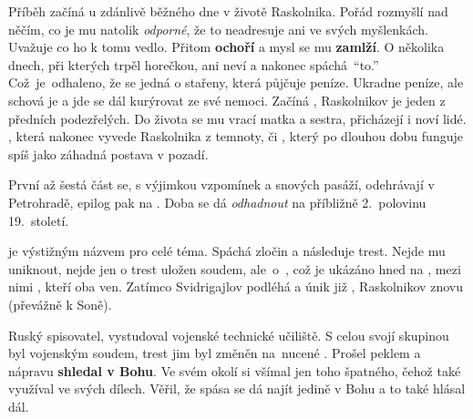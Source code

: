 \documentclass{extarticle} %
\begin{document}
\noindent 
Příběh začíná u zdánlivě běžného dne v životě Raskolnika.
Pořád rozmyšlí nad něčím, co je mu natolik \textit{odporné}, že to neadresuje ani ve svých myšlenkách.
Uvažuje co ho k tomu vedlo.
Přitom \textbf{ochoří} a mysl se mu \textbf{zamlží}.
O několika dnech, při kterých trpěl horečkou, ani neví a nakonec spáchá~\enquote{to.}
Což~je~odhaleno, že se jedná o  stařeny, která půjčuje peníze.
Ukradne peníze, ale schová je a jde se dál kurýrovat ze své nemoci.
Začíná , Raskolnikov je jeden z předních podezřelých.
Do života se mu vrací matka a sestra, přicházejí i noví lidé.
, která nakonec vyvede Raskolnika z temnoty, či , který po dlouhou dobu funguje spíš jako záhadná postava v pozadí.

\noindent 
První až šestá část se, s výjimkou vzpomínek a snových pasáží, odehrávají v Petrohradě, epilog pak na .
Doba se dá \textit{odhadnout} na příbližně 2.~polovinu 19.~století.

\noindent 
{} je výstižným názvem pro celé téma.
Spáchá zločin a následuje trest.
Nejde mu uniknout, nejde jen o trest uložen soudem, ale~o~, což je ukázáno hned na , mezi nimi , kteří oba  ven.
Zatímco Svidrigajlov podléhá a únik již , Raskolnikov znovu  (převážně k Soně).






\noindent 
Ruský spisovatel, vystudoval vojenské technické učiliště.
S celou svojí skupinou byl  vojenským soudem, trest jim byl změněn na~nucené .
Prošel peklem a nápravu \textbf{shledal v Bohu}.
Ve svém okolí si všímal jen toho špatného, čehož také využíval ve svých dílech.
Věřil, že spása se dá najít jedině v Bohu a to také hlásal dál.
\end{document}

